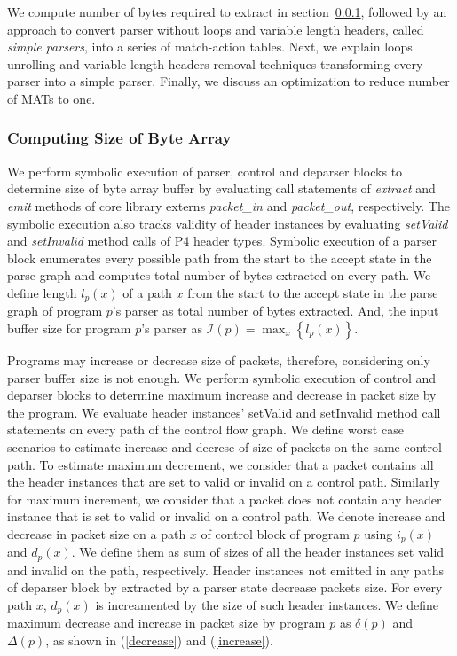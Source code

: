 \documentclass{hotnets19}
\begin{document}
We compute number of bytes required to extract in section~\ref{subsubsection:computing-size-of-byte-array}, followed by an approach to convert parser without loops and variable length headers, called \textit{simple parsers}, into a series of match-action tables.
Next, we explain loops unrolling and variable length headers removal techniques transforming every parser into a simple parser.
Finally, we discuss an optimization to reduce number of MATs to one.


\subsubsection{Computing Size of Byte Array}
\label{subsubsection:computing-size-of-byte-array}
We perform symbolic execution of parser, control and deparser blocks to determine size of byte array buffer by evaluating call statements of \emph{extract} and \emph{emit} methods of core library externs \emph{packet\_in} and \emph{packet\_out}, respectively.
The symbolic execution also tracks validity of header instances by evaluating \emph{setValid} and \emph{setInvalid} method calls of P4 header types.
Symbolic execution of a parser block enumerates every possible path from the start to the accept state in the parse graph and computes total number of bytes extracted on every path.
We define length $l_{p}(x)$ of a path $x$ from the start to the accept state in the parse graph of program $p$'s parser as total number of bytes extracted.
And, the input buffer size for program $p$'s parser as $\mathcal{I}(p) = \max_{x}\left\{l_{p}(x)\right\}$. 


Programs may increase or decrease size of packets, therefore, considering only parser buffer size is not enough.
We perform symbolic execution of control and deparser blocks to determine maximum increase and decrease in packet size by the program.
We evaluate header instances' setValid and setInvalid method call statements on every path of the control flow graph.
We define worst case scenarios to estimate increase and decrese of size of packets on the same control path.
To estimate maximum decrement, we consider that a packet contains all the header instances that are set to valid or invalid on a control path.
Similarly for maximum increment, we consider that a packet does not contain any header instance that is set to valid or invalid on a control path. 
We denote increase and decrease in packet size on a path $x$ of control block of program $p$ using $i_{p}(x)$ and $d_{p}(x)$.
We define them as sum of sizes of all the header instances set valid and invalid on the path, respectively.
Header instances not emitted in any paths of deparser block by extracted by a parser state decrease packets size. 
For every path $x$, $d_{p}(x)$ is increamented by the size of such header instances. 
We define maximum decrease and increase in packet size by program $p$ as $\delta(p)$ and $\Delta(p)$, as shown in (\ref{decrease}) and (\ref{increase}).
\end{document}
